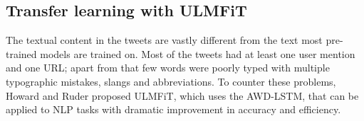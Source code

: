 \subsection{Transfer learning with ULMFiT}
	\label{stance}
	The textual content in the tweets are vastly different from the text most pre-trained models are trained on. Most of the tweets had at least one user mention and one URL; apart from that few words were poorly typed with multiple typographic mistakes, slangs and abbreviations.  
	To counter these problems, Howard and Ruder \cite{howard2018universal} proposed ULMFiT, which uses the AWD-LSTM\cite{merity2017regularizing}, that can be applied to NLP tasks with dramatic improvement in accuracy and efficiency. 
	
